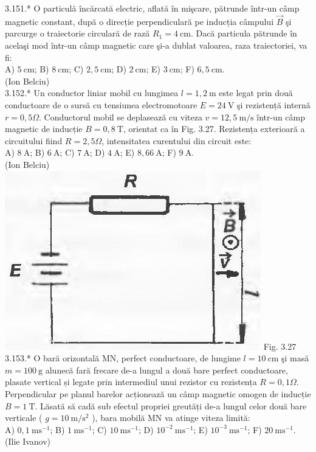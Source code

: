 \documentclass[10pt]{article}
\begin{document}
3.151.* O particulă încărcată electric, aflată în mişcare, pătrunde într-un câmp magnetic constant, după o direcție perpendiculară pe inducția câmpului $\vec{B}$ şi parcurge o traiectorie circulară de rază $R_{1}=4 \mathrm{~cm}$. Dacă particula pătrunde în acelaşi mod într-un câmp magnetic care şi-a dublat valoarea, raza traiectoriei, va fi:\\ A) $5 \mathrm{~cm}$; B)  $8 \mathrm{~cm}$; C) $2,5 \mathrm{~cm}$; D) $2 \mathrm{~cm}$; E) $3 \mathrm{~cm}$; F) $6,5 \mathrm{~cm}$.\\ (Ion Belciu)\\

3.152.* Un conductor liniar mobil cu lungimea $l=1,2 \mathrm{~m}$ este legat prin două conductoare de o sursă cu tensiunea electromotoare $E=24 \mathrm{~V}$ şi rezistență internă $r=0,5 \Omega$. Conductorul mobil se deplasează cu viteza $v=12,5 \mathrm{~m} / \mathrm{s}$ într-un câmp magnetic de inducție $B=0,8 \mathrm{~T}$, orientat ca în Fig. 3.27. Rezistența exterioară a circuitului fiind $R=2,5 \Omega$, intensitatea curentului din circuit este:\\ A) $8 \mathrm{~A}$; B) $6 \mathrm{~A}$; C) $7 \mathrm{~A}$; D) $4 \mathrm{~A}$; E) $8,66 \mathrm{~A}$; F) $9 \mathrm{~A}$.\\ (Ion Belciu)\\ \includegraphics[max width=\textwidth, center]{2025_07_01_5b3ff9fa0d508c8e9f17g-177} Fig. 3.27\\

3.153.* O bară orizontală MN, perfect conductoare, de lungime $l=10 \mathrm{~cm}$ şi masă $m=100 \mathrm{~g}$ alunecă fară frecare de-a lungul a două bare perfect conductoare, plasate vertical și legate prin intermediul unui rezistor cu rezistența $R=0,1 \Omega$. Perpendicular pe planul barelor acționează un câmp magnetic omogen de inducție $B=1 \mathrm{~T}$. Lăsată să cadă sub efectul propriei greutăți de-a lungul celor două bare verticale ( $g=10 \mathrm{~m} / \mathrm{s}^{2}$ ), bara mobilă MN va atinge viteza limită:\\ A) $0,1 \mathrm{~ms}^{-1}$; B) $1 \mathrm{~ms}^{-1}$; C) $10 \mathrm{~ms}^{-1}$; D) $10^{-2} \mathrm{~ms}^{-1}$; E) $10^{-3} \mathrm{~ms}^{-1}$; F) $20 \mathrm{~ms}^{-1}$.\\ (Ilie Ivanov)\\
\end{document}
